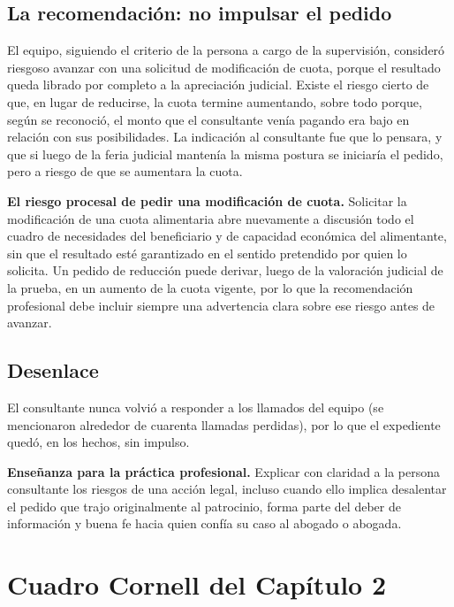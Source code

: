 \documentclass[12pt,oneside]{book}
\begin{document}
\subsection{La recomendación: no impulsar el pedido}

El equipo, siguiendo el criterio de la persona a cargo de la supervisión, consideró riesgoso avanzar con una solicitud de modificación de cuota, porque el resultado queda librado por completo a la apreciación judicial. Existe el riesgo cierto de que, en lugar de reducirse, la cuota termine aumentando, sobre todo porque, según se reconoció, el monto que el consultante venía pagando era bajo en relación con sus posibilidades. La indicación al consultante fue que lo pensara, y que si luego de la feria judicial mantenía la misma postura se iniciaría el pedido, pero a riesgo de que se aumentara la cuota.

\begin{important}
\textbf{El riesgo procesal de pedir una modificación de cuota.} Solicitar la modificación de una cuota alimentaria abre nuevamente a discusión todo el cuadro de necesidades del beneficiario y de capacidad económica del alimentante, sin que el resultado esté garantizado en el sentido pretendido por quien lo solicita. Un pedido de reducción puede derivar, luego de la valoración judicial de la prueba, en un aumento de la cuota vigente, por lo que la recomendación profesional debe incluir siempre una advertencia clara sobre ese riesgo antes de avanzar.
\end{important}

\subsection{Desenlace}

El consultante nunca volvió a responder a los llamados del equipo (se mencionaron alrededor de cuarenta llamadas perdidas), por lo que el expediente quedó, en los hechos, sin impulso.

\begin{note}
\textbf{Enseñanza para la práctica profesional.} Explicar con claridad a la persona consultante los riesgos de una acción legal, incluso cuando ello implica desalentar el pedido que trajo originalmente al patrocinio, forma parte del deber de información y buena fe hacia quien confía su caso al abogado o abogada.
\end{note}

\section{Cuadro Cornell del Capítulo 2}
\end{document}
